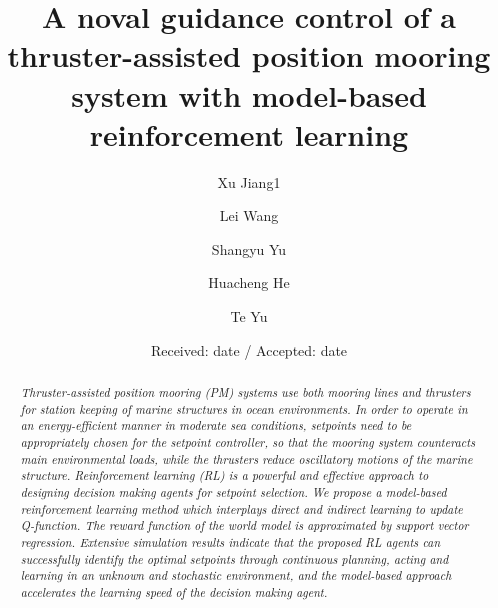 \begin{sloppypar}
\title{A noval guidance control of a thruster-assisted position mooring system with model-based reinforcement learning
}


\author{Xu Jiang1 \and
	Lei Wang     \and
	Shangyu Yu     \and
	Huacheng He	 \and
	Te Yu
}



\date{Received: date / Accepted: date}


\maketitle
\begin{abstract}
{\it Thruster-assisted position mooring (PM) systems use both mooring lines and thrusters for station keeping of marine structures in ocean environments. In order to operate in an energy-efficient manner in moderate sea conditions, setpoints need to be appropriately chosen for the setpoint controller, so that the mooring system counteracts main environmental loads, while the thrusters reduce oscillatory motions of the marine structure. Reinforcement learning (RL) is a powerful and effective approach to designing decision making agents for setpoint selection. We propose a model-based reinforcement learning method which interplays direct and indirect learning to update Q-function. The reward function of the world model is approximated by support vector regression. Extensive simulation results indicate that the proposed RL agents can successfully identify the optimal setpoints through continuous planning, acting and learning in an unknown and stochastic environment, and the model-based approach accelerates the learning speed of the decision making agent.}
	

\end{abstract}
\end{sloppypar}
